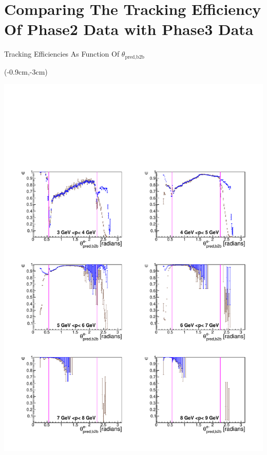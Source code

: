 \documentclass[8pt]{beamer}
\begin{document}
\section{Comparing The Tracking Efficiency Of Phase2 Data with Phase3 Data}






\begin{frame}{Tracking Efficiencies As Function Of $\theta_{\textrm{pred,b2b}}$}



\begin{textblock*}{6.5cm}(-0.9cm,-3cm)
		
	\includegraphics[width=\textwidth]{VPlots/Comp/cMThetaem_Data}
\end{textblock*}


\end{frame}
\end{document}

